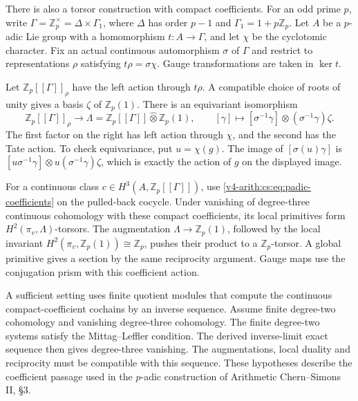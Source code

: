 There is also a torsor construction with compact coefficients. For an odd
prime \(p\), write \(\Gamma=\mathbb Z_p^\times=\Delta\times\Gamma_1\), where
\(\Delta\) has order \(p-1\) and \(\Gamma_1=1+p\mathbb Z_p\). Let \(A\) be a
\(p\)-adic Lie group with a homomorphism \(t:A\to\Gamma\), and let \(\chi\)
be the cyclotomic character. Fix an actual continuous automorphism
\(\sigma\) of \(\Gamma\) and restrict to representations \(\rho\) satisfying
\(t\rho=\sigma\chi\). Gauge transformations are taken in \(\ker t\).

Let \(\mathbb Z_p[[\Gamma]]_\rho\) have the left action through \(t\rho\). A
compatible choice of roots of unity gives a basis \(\zeta\) of \(\mathbb
Z_p(1)\). There is an equivariant isomorphism
\begin{equation}
 \mathbb Z_p[[\Gamma]]_\rho
   \longrightarrow
 \Lambda=\mathbb Z_p[[\Gamma]]\widehat\otimes\mathbb Z_p(1),
 \qquad
 [\gamma]\longmapsto
 [\sigma^{-1}\gamma]\otimes(\sigma^{-1}\gamma)\zeta.
 \label{v4-arith:cs:eq:padic-coefficients}
\end{equation}
The first factor on the right has left action through \(\chi\), and the
second has the Tate action. To check equivariance, put \(u=\chi(g)\). The
image of \([\sigma(u)\gamma]\) is \([u\sigma^{-1}\gamma]\otimes
u(\sigma^{-1}\gamma)\zeta\), which is exactly the action of \(g\) on the
displayed image.

For a continuous class \(c\in H^3(A,\mathbb Z_p[[\Gamma]])\), use
\eqref{v4-arith:cs:eq:padic-coefficients} on the pulled-back cocycle. Under
vanishing of degree-three continuous cohomology with these compact
coefficients, its local primitives form \(H^2(\pi_v,\Lambda)\)-torsors. The
augmentation \(\Lambda\to\mathbb Z_p(1)\), followed by the local invariant
\(H^2(\pi_v,\mathbb Z_p(1))\cong\mathbb Z_p\), pushes their product to a
\(\mathbb Z_p\)-torsor. A global primitive gives a section by the same
reciprocity argument. Gauge maps use the conjugation prism with this
coefficient action.

A sufficient setting uses finite quotient modules that compute the
continuous compact-coefficient cochains by an inverse sequence. Assume
finite degree-two cohomology and vanishing degree-three cohomology. The
finite degree-two systems satisfy the Mittag--Leffler condition. The derived
inverse-limit exact sequence then gives degree-three vanishing. The
augmentations, local duality and reciprocity must be compatible with this
sequence. These hypotheses describe the coefficient passage used in the
\(p\)-adic construction of Arithmetic Chern--Simons II, \S3.

